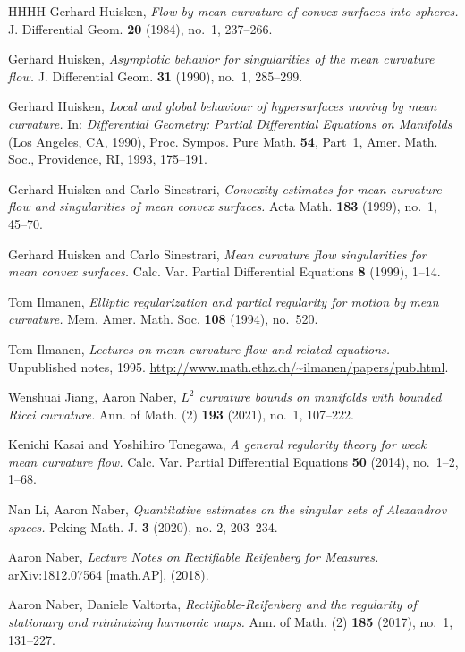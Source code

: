 \documentclass[11pt,reqno]{amsart}
\numberwithin{equation}{section}
\theoremstyle{definition}
\theoremstyle{remark}
\theoremstyle{remark}
\theoremstyle{remark}
\theoremstyle{remark}\newtheorem{conjecture}[equation]{Conjecture}
\theoremstyle{remark}\newtheorem{question}[equation]{Question}
\begin{document}
\begin{thebibliography}{HHHH}
Gerhard Huisken,
\emph{Flow by mean curvature of convex surfaces into spheres.}
J. Differential Geom. \textbf{20} (1984), no.~1, 237–266.

Gerhard Huisken,
\emph{Asymptotic behavior for singularities of the mean curvature flow.}
J. Differential Geom. \textbf{31} (1990), no.~1, 285–299.

Gerhard Huisken,
\emph{Local and global behaviour of hypersurfaces moving by mean curvature.}
In: \emph{Differential Geometry: Partial Differential Equations on Manifolds} (Los Angeles, CA, 1990),
Proc. Sympos. Pure Math. \textbf{54}, Part~1, Amer. Math. Soc., Providence, RI, 1993, 175–191.


Gerhard Huisken and Carlo Sinestrari,
\emph{Convexity estimates for mean curvature flow and singularities of mean convex surfaces.}
Acta Math. \textbf{183} (1999), no.~1, 45–70.

Gerhard Huisken and Carlo Sinestrari,
\emph{Mean curvature flow singularities for mean convex surfaces.}
Calc. Var. Partial Differential Equations \textbf{8} (1999), 1–14.



Tom Ilmanen,
\emph{Elliptic regularization and partial regularity for motion by mean curvature.}
Mem. Amer. Math. Soc. \textbf{108} (1994), no.~520.

Tom Ilmanen,
\emph{Lectures on mean curvature flow and related equations.}
Unpublished notes, 1995. \url{http://www.math.ethz.ch/~ilmanen/papers/pub.html}.

Wenshuai Jiang, Aaron Naber,
\emph{$L^2$ curvature bounds on manifolds with bounded Ricci curvature.}
Ann. of Math. (2) \textbf{193} (2021), no.~1, 107–222.

Kenichi Kasai and Yoshihiro Tonegawa,
\emph{A general regularity theory for weak mean curvature flow.}
Calc. Var. Partial Differential Equations \textbf{50} (2014), no.~1–2, 1–68.



Nan Li, Aaron Naber, 
\emph{ Quantitative estimates on the singular sets of Alexandrov spaces.} Peking Math. J. \textbf{3} (2020), no. 2, 203–234.

 Aaron Naber, \emph{Lecture Notes on Rectifiable Reifenberg for Measures.}
arXiv:1812.07564 [math.AP], (2018).

Aaron Naber, Daniele Valtorta,
\emph{Rectifiable-Reifenberg and the regularity of stationary and minimizing harmonic maps.}
Ann. of Math. (2) \textbf{185} (2017), no.~1, 131–227.


\end{thebibliography}
\end{document}
